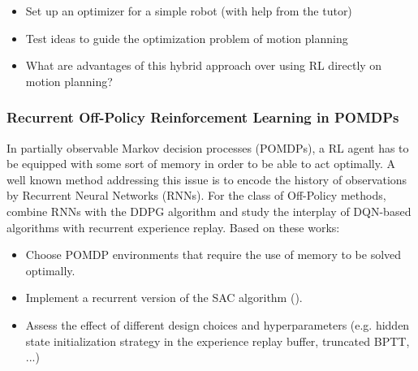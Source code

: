 \documentclass[a4paper]{article}
\begin{document}
\begin{itemize}
  \item Set up an optimizer for a simple robot (with help from the tutor)
  \item Test ideas to guide the optimization problem of motion planning
  \item What are advantages of this hybrid approach over using RL directly on motion planning?
\end{itemize}

\subsubsection{Recurrent Off-Policy Reinforcement Learning in POMDPs}
In partially observable Markov decision processes (POMDPs), a RL agent has to be equipped with some sort of memory in order to be able to act optimally. A well known method addressing this issue is to encode the history of observations by Recurrent Neural Networks (RNNs).
For the class of Off-Policy methods, \cite{heess2015memory} combine RNNs with the DDPG algorithm and \cite{kapturowski2018recurrent} study the interplay of DQN-based algorithms with recurrent experience replay.
Based on these works:
\begin{itemize}
  \item Choose POMDP environments that require the use of memory to be solved optimally.
  \item Implement a recurrent version of the SAC algorithm (\cite{Haarnoja2018a}).
  \item Assess the effect of different design choices and hyperparameters (e.g. hidden state initialization strategy in the experience replay buffer, truncated BPTT, ...)
\end{itemize}
\end{document}
